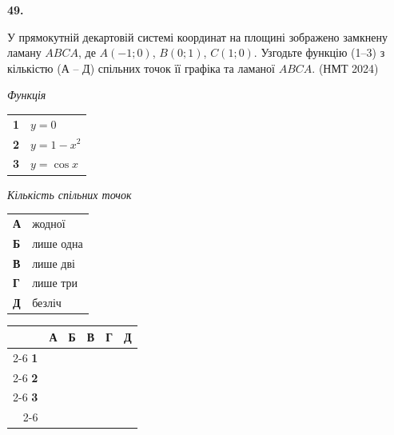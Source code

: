 \documentclass[14pt]{extarticle}
\newcommand{\answerGrid}{
    \begingroup
    \renewcommand{\arraystretch}{1.3} 
    \setlength{\tabcolsep}{7pt} 
    \begin{tabular}{r|c|c|c|c|c|}
         \multicolumn{1}{c}{} & \multicolumn{1}{c}{\textbf{А}} & \multicolumn{1}{c}{\textbf{Б}} & \multicolumn{1}{c}{\textbf{В}} & \multicolumn{1}{c}{\textbf{Г}} & \multicolumn{1}{c}{\textbf{Д}} \\ \cline{2-6}
         \textbf{1} & & & & & \\ \cline{2-6}
         \textbf{2} & & & & & \\ \cline{2-6}
         \textbf{3} & & & & & \\ \cline{2-6}
    \end{tabular}
    \endgroup
}
\newcommand{\matchingLayout}[3]{
    \noindent
    \begin{minipage}[t]{0.40\textwidth}
       
        #1
    \end{minipage}%
    \hfill
    \begin{minipage}[t]{0.28\textwidth}
        
        #2
    \end{minipage}%
    \hfill
    \begin{minipage}[t]{0.30\textwidth}
        \vspace{0pt} %
        \begin{flushright}
        #3
        \end{flushright}
    \end{minipage}
}
\newcommand{\nmtyear}[1]{\hfill{\small\color{yearcolor}(НМТ #1)}}
\begin{document}
\vspace{0.7cm}
\noindent\textbf{49.} \begin{minipage}[t]{0.55\textwidth}
У прямокутній декартовій системі координат на площині зображено замкнену ламану $ABCA$, де $A(-1; 0)$, $B(0; 1)$, $C(1; 0)$. Узгодьте функцію (1–3) з кількістю (А – Д) спільних точок її графіка та ламаної $ABCA$. \nmtyear{2024}
\end{minipage}
\hfill
\begin{minipage}[t]{0.4\textwidth}
    \vspace{-0.5cm}
    \begin{flushright}
    \end{flushright}
\end{minipage}

\vspace{0.3cm}

\matchingLayout{
    \textit{Функція} \par \vspace{0.2cm}
    \begin{tabular}{@{}p{0.5cm} l@{}}
    \textbf{1} & $y=0$ \\[0.4cm]
    \textbf{2} & $y=1-x^2$ \\[0.4cm]
    \textbf{3} & $y=\cos x$ \\
    \end{tabular}
}{
    \textit{Кількість спільних точок} \par \vspace{0.2cm}
    \begin{tabular}{@{}p{0.5cm} l@{}}
    \textbf{А} & жодної \\[0.4cm]
    \textbf{Б} & лише одна \\[0.4cm]
    \textbf{В} & лише дві \\[0.4cm]
    \textbf{Г} & лише три \\[0.4cm]
    \textbf{Д} & безліч \\
    \end{tabular}
}{
    \answerGrid
}
\end{document}

